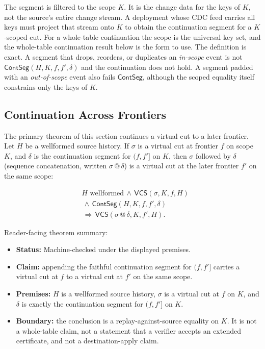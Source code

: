 \documentclass[letterpaper,10pt,twocolumn]{article}
\newcommand{\VCS}{\mathsf{VCS}}
\newcommand{\ContSeg}{\mathsf{ContSeg}}
\providecommand{\tightlist}{\setlength{\itemsep}{0pt}\setlength{\parskip}{0pt}}
\begin{document}
The segment is filtered to the scope $K$. It is the change data for
the keys of $K$, not the source's entire change stream. A deployment
whose CDC feed carries all keys must project that stream onto $K$ to
obtain the continuation segment for a $K$-scoped cut. For a
whole-table continuation the scope is the universal key set, and the
whole-table continuation result below is the form to use. The
definition is exact. A segment that drops, reorders, or duplicates
an \emph{in-scope} event is not $\ContSeg(H,K,f,f',\delta)$ and the
continuation does not hold. A
segment padded with an \emph{out-of-scope} event also fails
$\ContSeg$, although the scoped equality itself constrains only the
keys of $K$.

\subsection{Continuation Across
Frontiers}\label{continuation-across-frontiers}

The primary theorem of this section continues a virtual cut to a later
frontier. Let $H$ be a wellformed source history. If $\sigma$ is a
virtual cut at frontier $f$ on scope $K$, and $\delta$ is the
continuation segment for $(f,f']$ on $K$, then $\sigma$ followed by
$\delta$ (sequence concatenation, written $\sigma \mathbin{@} \delta$)
is a virtual cut at the later frontier $f'$ on the same scope:

\[
\begin{aligned}
&H \text{ wellformed} \,\land\, \VCS(\sigma,K,f,H)\\
&\,\land\, \ContSeg(H,K,f,f',\delta)\\
&\,\Longrightarrow\, \VCS(\sigma \mathbin{@} \delta, K, f', H).
\end{aligned}
\]

Reader-facing theorem summary:

\begin{itemize}
\tightlist
\item
  \textbf{Status:} Machine-checked under the displayed
  premises.
\item
  \textbf{Claim:} appending the faithful continuation segment for
  $(f,f']$ carries a virtual cut at $f$ to a virtual cut at $f'$ on the
  same scope.
\item
  \textbf{Premises:} $H$ is a wellformed source history, $\sigma$ is a
  virtual cut at $f$ on $K$, and $\delta$ is exactly the continuation
  segment for $(f,f']$ on $K$.
\item
  \textbf{Boundary:} the conclusion is a replay-against-source equality
  on $K$. It is not a whole-table claim, not a statement that a verifier
  accepts an extended certificate, and not a destination-apply claim.
\end{itemize}
\end{document}
